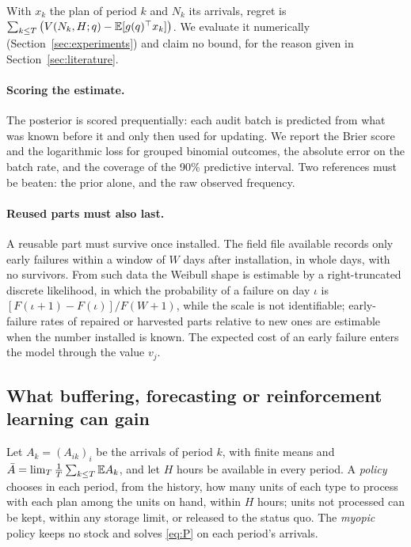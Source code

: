 \begin{center}
\end{center}

With $x_k$ the plan of period $k$ and $N_k$ its arrivals, regret is
$\sum_{k\le T}\big(V(N_k,H;q)-\mathbb{E}[g(q)^\top x_k]\big)$. We evaluate it numerically
(Section~\ref{sec:experiments}) and claim no bound, for the reason given in Section~\ref{sec:literature}.

\paragraph{Scoring the estimate.} The posterior is scored prequentially: each audit batch is predicted from what
was known before it and only then used for updating. We report the Brier score and the logarithmic loss for grouped
binomial outcomes, the absolute error on the batch rate, and the coverage of the 90\% predictive interval. Two
references must be beaten: the prior alone, and the raw observed frequency.

\paragraph{Reused parts must also last.} A reusable part must survive once installed. The field file available
records only early failures within a window of $W$ days after installation, in whole days, with no survivors. From
such data the Weibull shape is estimable by a right-truncated discrete likelihood, in which the probability of a
failure on day $\iota$ is $[F(\iota+1)-F(\iota)]/F(W+1)$, while the scale is not identifiable; early-failure rates
of repaired or harvested parts relative to new ones are estimable when the number installed is known. The expected
cost of an early failure enters the model through the value $v_j$.

\subsection{What buffering, forecasting or reinforcement learning can gain}

Let $A_k=(A_{ik})_i$ be the arrivals of period $k$, with finite means and
$\bar A=\lim_T\frac1T\sum_{k\le T}\mathbb{E} A_k$, and let $H$ hours be available in every period. A \emph{policy} chooses in
each period, from the history, how many units of each type to process with each plan among the units on hand,
within $H$ hours; units not processed can be kept, within any storage limit, or released to the status quo. The
\emph{myopic} policy keeps no stock and solves \eqref{eq:P} on each period's arrivals.

